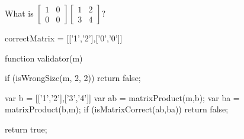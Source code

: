 \documentclass{ximera}
\begin{document}
\begin{question}
\begin{solution}
\begin{hint}
\begin{question}
\begin{solution}
\begin{hint}
  				\end{hint}
  				What is $\begin{bmatrix}  1 &0 \\ 0&0\end{bmatrix} \begin{bmatrix} 1 & 2 \\ 3 & 4 \end{bmatrix}$?
  					\begin{matrix-answer}[name=A]
  						correctMatrix = [['1','2'],['0','0']]
  					\end{matrix-answer}
  			\end{solution}
  		\end{question}
  	\end{hint}
  	
    \begin{matrix-answer}[name=A]
    function validator(m) {
      if (isWrongSize(m, 2, 2)) return false;
      
      var b = [['1','2'],['3','4']]
      var ab = matrixProduct(m,b);
      var ba = matrixProduct(b,m);
      if (isMatrixCorrect(ab,ba))
        return false;

      return true;
    }
    \end{matrix-answer}  
  \end{solution}
\end{question}
	
\end{document}
